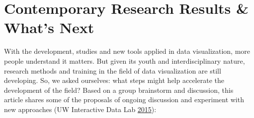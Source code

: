 \documentclass[]{book}
\begin{document}
\hypertarget{contemporary-research-results-whats-next}{%
\section{Contemporary Research Results \& What's Next}\label{contemporary-research-results-whats-next}}

With the development, studies and new tools applied in data visualization, more people understand it matters. But given its youth and interdisciplinary nature, research methods and training in the field of data visualization are still developing. So, we asked ourselves: what steps might help accelerate the development of the field? Based on a group brainstorm and discussion, this article shares some of the proposals of ongoing discussion and experiment with new approaches (UW Interactive Data Lab \protect\hyperlink{ref-Next_Steps}{2015}):
\end{document}
